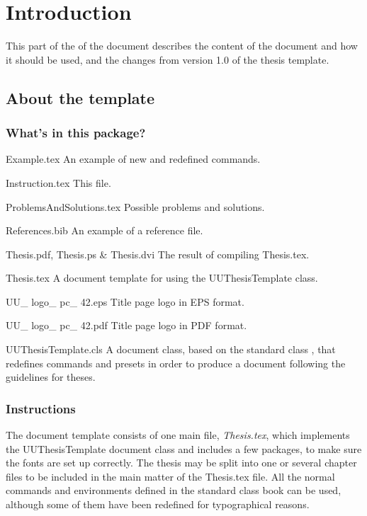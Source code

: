 \part{Introduction}%
This part of the of the document describes the content of the document and how it should be used, and the changes from version 1.0 of the thesis template.
\chapter{About the template}
\section{What's in this package?}

\begin{definitionlist}
    \item{Example.tex} An example of new and redefined commands.
    \item{Instruction.tex} This file.
    \item{ProblemsAndSolutions.tex} Possible problems and solutions.
    \item{References.bib} An example of a reference file. 
    \item{Thesis.pdf, Thesis.ps \& Thesis.dvi} The result of compiling Thesis.tex.
    \item{Thesis.tex} A document template for using the UUThesisTemplate class.
    \item{UU\_ logo\_ pc\_ 42.eps} Title page logo in EPS format.
    \item{UU\_ logo\_ pc\_ 42.pdf} Title page logo in PDF format.
    \item{UUThesisTemplate.cls} A document class, based on the standard class , that redefines commands and presets in order to produce a document following the guidelines for theses.   
\end{definitionlist}

\section{Instructions}
The document template consists of one main file, \emph{Thesis.tex}, which implements the UUThesisTemplate document class and includes a few packages, to make sure the fonts are set up correctly. The thesis may be split into one or several chapter files to be included in the main matter of the Thesis.tex file. All the normal commands and environments defined in the standard class book can be used, although some of them have been redefined for typographical reasons. 

